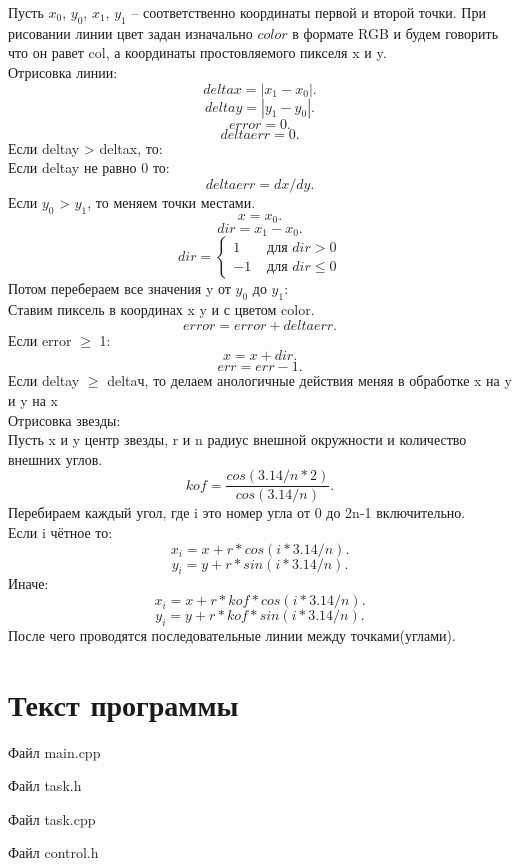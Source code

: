\documentclass[14pt, a4paper]{extreport}
\begin{document}
Пусть $x_0$, $y_0$, $x_1$, $y_1$ -- соответственно координаты первой и второй точки.
При рисовании линии цвет задан изначально $color$ в формате RGB и будем говорить что он равет col, а координаты простовляемого пикселя x и y.\\
Отрисовка линии:
$$ deltax = |x_1-x_0| . $$
$$ deltay = |y_1-y_0| . $$
$$ error = 0 . $$
$$ deltaerr = 0 . $$
Если deltay > deltax, то:\\
Если deltay не равно 0 то:
$$ deltaerr = dx/dy . $$
Если $y_0$ > $y_1$, то меняем точки местами.
$$ x = x_0 . $$
$$ dir = x_1-x_0 . $$
\begin{equation*}
dir =
\left\{
\begin{array}{lr}
1 & \text{ для } dir > 0 \\
-1 & \text{ для } dir \leq 0
\end{array}
\right.
\end{equation*}
Потом перебераем все значения y от $y_0$ до $y_1$:\\
Ставим пиксель в координах x y и с цветом color.
$$ error = error+deltaerr . $$
Если error $\geq$ 1:
$$ x = x+dir. $$
$$ err = err-1. $$
Если deltay $\geq$ deltaч, то делаем анологичные действия меняя в обработке x на y и y на x\\

Отрисовка звезды:\\
Пусть x и y центр звезды, r и n радиус внешной окружности и количество внешних углов.
$$ kof = \frac{cos(3.14/n*2)}{cos(3.14/n)} . $$
Перебираем каждый угол, где i это номер угла от 0 до 2n-1 включительно.\\
Если i чётное то:
$$ x_{i} = x+r*cos(i*3.14/n) . $$
$$ y_{i} = y+r*sin(i*3.14/n) . $$
Иначе:
$$ x_{i} = x+r*kof*cos(i*3.14/n) . $$
$$ y_{i} = y+r*kof*sin(i*3.14/n) . $$
После чего проводятся последовательные линии между точками(углами).

\chapter{Текст программы}

\noindent Файл main.cpp

\pagebreak
\hrulefill

\noindent Файл task.h

\hrulefill

\noindent Файл task.cpp

\hrulefill

\noindent Файл control.h

\hrulefill
\end{document}
